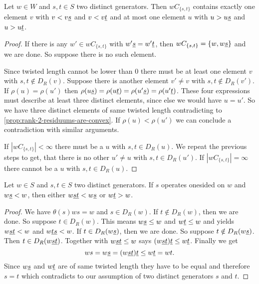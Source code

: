 \begin{coro}
	Let $w \in W$ and $s,t \in S$ two distinct generators. Then $wC_{\{s,t\}}$ contains exactly one element $v$ with $v < v \underline{s}$ and $v < v \underline{t}$ and at most one element $u$ with $u > u \underline{s}$ and $u > u \underline{t}$.

	\begin{proof}
		If there is any $w' \in wC_{\{s,t\}}$ with $w' \underline{s} = w' \underline{t}$, then $wC_{\{s,t\}} = \{ w, w \underline{s} \}$ and we are done. So suppose there is no such element.

		Since twisted length cannot be lower than 0 there must be at least one element $v$ with $s,t \notin D_R(v)$. Suppose there is another element $v' \neq v$ with $s,t \notin D_R(v')$. If $\rho(u) = \rho(u')$ then $\rho(u \underline{s}) = \rho(u \underline{t}) = \rho(u' \underline{s}) = \rho(u' \underline{t})$. These four expressions must describe at least three distinct elements, since else we would have $u = u'$. So we have three distinct elements of same twisted length contradicting to \ref{prop:rank-2-residuums-are-convex}. If $\rho(u) < \rho(u')$ we can conclude a contradiction with similar arguments.

		If $|wC_{\{s,t\}}| < \infty$ there must be a $u$ with $s,t \in D_R(u)$. We repeat the previous steps to get, that there is no other $u' \neq u$ with $s,t \in D_R(u')$. If $|wC_{\{s,t\}}| = \infty$ there cannot be a $u$ with $s,t \in D_R(u)$.
	\end{proof}
\end{coro}

\begin{prop}
	Let $w \in S$ and $s,t \in S$ two distinct generators. If $s$ operates onesided on $w$ and $w \underline{s} < w$, then either $w \underline{st} < w \underline{s}$ or $w \underline{t} > w$.

	\begin{proof}
		We have $\theta(s)ws = w$ and $s \in D_R(w)$. If $t \notin D_R(w)$, then we are done. So suppose $t \in D_R(w)$. This means $w \underline{s} \leq w$ and $w \underline{t} \leq w$ and \cite[Lemma 3.9]{hultman:comb-twisted-invo} yields $w \underline{st} < w$ and $w \underline{ts} < w$. If $t \in D_R(w \underline{s})$, then we are done. So suppose $t \notin D_R(w \underline{s})$. Then $t \in D_R(w \underline{st})$. Together with $w \underline{st} \leq w$ \cite[Lemma 3.9(2)]{hultman:comb-twisted-invo} says $(w \underline{st}) \underline{t} \leq w \underline{t}$. Finally we get
		$$ ws = w \underline{s} = (w \underline{st}) \underline{t} \leq w \underline{t} = wt.$$
		Since $w \underline{s}$ and $w \underline{t}$ are of same twisted length they have to be equal and therefore $s = t$ which contradicts to our assumption of two distinct generators $s$ and $t$.
	\end{proof}
\end{prop}

